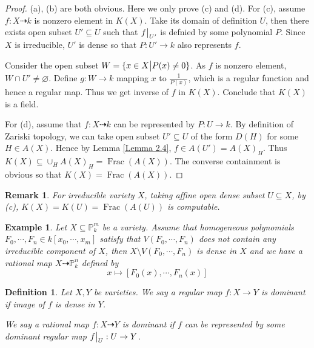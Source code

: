 \documentclass{ctexart}
\newtheorem{definition}{Definition}[section]
\newtheorem{remark}{Remark}[section]
\newtheorem{example}{Example}[section]
\newcommand{\fraction}{\operatorname{Frac}}
\begin{document}
\begin{proof}
    (a), (b) are both obvious. Here we only prove (c) and (d).
    For (c), assume $f: X \dashrightarrow k$ is nonzero element in $K(X)$.
    Take its domain of definition $U$, then there exists open subset $U' \subseteq U$ such that $f\big{|}_{U'}$ is defnied by some polynomial $P$.
    Since $X$ is irreducible, $U'$ is dense so that $P: U' \rightarrow k$ also represents $f$.
    \par
    Consider the open subset $W = \{x\in X \big{|} P(x) \neq 0\}$.
    As $f$ is nonzero element, $W \cap U' \neq \varnothing$.
    Define $g: W \rightarrow k$ mapping $x$ to $\frac{1}{P(x)}$, which is a regular function and hence a regular map.
    Thus we get inverse of $f$ in $K(X)$.
    Conclude that $K(X)$ is a field.
    \par
    For (d), assume that $f: X \dashrightarrow k$ can be represented by $P: U \rightarrow k$.
    By definition of Zariski topology, we can take open subset $U' \subseteq U$ of the form $D(H)$ for some $H\in A(X)$.
    Hence by Lemma \ref{Lemma 2.4}, $f\in A(U') = A(X)_{H}$.
    Thus $K(X) \subseteq \cup_{H} A(X)_{H} = \fraction(A(X))$.
    The converse containment is obvious so that $K(X) = \fraction(A(X))$.
\end{proof}
\begin{remark}
    For irreducible variety $X$, taking affine open dense subset $U \subseteq X$,
    by (c), $K(X) = K(U) = \fraction(A(U))$ is computable.
\end{remark}
\begin{example}
    Let $X \subseteq \mathbb{P}_{k}^{m}$ be a variety.
    Assume that homogeneous polynomials $F_{0}, \cdots, F_{n}\in k[x_{0}, \cdots, x_{m}]$ satisfy that $V(F_{0}, \cdots, F_{n})$ does not contain any irreducible component of $X$,
    then $X \setminus V(F_{0}, \cdots, F_{n})$ is dense in $X$ and we have a rational map $X \dashrightarrow \mathbb{P}_{k}^{n}$ defined by
    \begin{equation}
        x \longmapsto [F_{0}(x), \cdots, F_{n}(x)]
    \end{equation}
\end{example}
\vspace{-\baselineskip} %
\begin{definition}
    Let $X, Y$ be varieties.
    We say a regular map $f: X \rightarrow Y$ is dominant if image of $f$ is dense in $Y$.
    \par
    We say a rational map $f: X \dashrightarrow Y$ is dominant if $f$ can be represented by some dominant regular map $f\big{|}_{U}: U \rightarrow Y$.
\end{definition}
\end{document}
